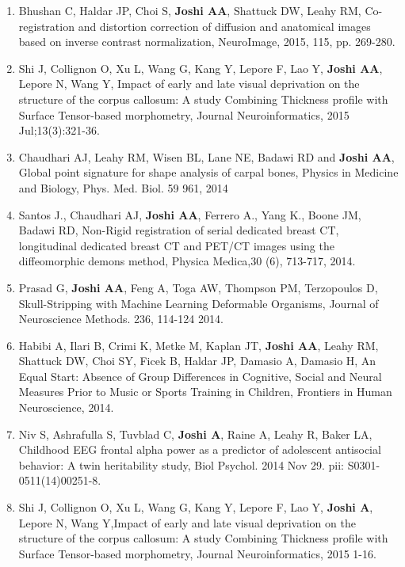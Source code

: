 \documentclass[overlapped,line,letterpaper]{res}
\begin{document}
\begin{resume}
\begin{enumerate}
    \item Bhushan C, Haldar JP, Choi S, \textbf{Joshi AA}, Shattuck DW, Leahy RM, {Co-registration and distortion correction of diffusion and anatomical images based on inverse contrast normalization}, NeuroImage, 2015, 115, pp. 269-280.

    \item Shi J, Collignon O, Xu L, Wang G, Kang Y, Lepore F, Lao Y, \textbf{Joshi AA}, Lepore N, Wang Y, {Impact of early and late visual deprivation on the structure of the corpus callosum: A study Combining Thickness profile with Surface Tensor-based morphometry}, Journal Neuroinformatics, 2015 Jul;13(3):321-36.

    \item Chaudhari AJ, Leahy RM, Wisen BL, Lane NE, Badawi RD and \textbf{Joshi AA}, {Global point signature for shape analysis of carpal bones}, Physics in Medicine and Biology,  Phys. Med. Biol. 59 961, 2014

    \item Santos J., Chaudhari AJ, \textbf{Joshi AA}, Ferrero A., Yang K., Boone JM, Badawi RD, {Non-Rigid registration of serial dedicated breast CT, longitudinal dedicated breast CT and PET/CT images using the diffeomorphic demons method}, Physica Medica,30 (6), 713-717, 2014.

    \item Prasad G, \textbf{Joshi AA}, Feng A, Toga AW, Thompson PM, Terzopoulos D, {Skull-Stripping with Machine Learning Deformable Organisms},  Journal of Neuroscience Methods.  236, 114-124 2014.

    \item Habibi A, Ilari B, Crimi K, Metke M, Kaplan JT, \textbf{Joshi AA}, Leahy RM, Shattuck DW, Choi SY, Ficek B, Haldar JP, Damasio A, Damasio H, {An Equal Start: Absence of Group Differences in Cognitive, Social and Neural Measures Prior to Music or Sports Training in Children},  Frontiers in Human Neuroscience, 2014.

    \item Niv S, Ashrafulla S, Tuvblad C, \textbf{Joshi A}, Raine A, Leahy R, Baker LA, {Childhood EEG frontal alpha power as a predictor of adolescent antisocial behavior: A twin heritability study}, Biol Psychol. 2014 Nov 29. pii: S0301-0511(14)00251-8.

    \item Shi J, Collignon O, Xu L, Wang G, Kang Y, Lepore F, Lao Y, \textbf{Joshi A}, Lepore N, Wang Y,{Impact of early and late visual deprivation on the structure of the corpus callosum: A study Combining Thickness profile with Surface Tensor-based morphometry}, Journal Neuroinformatics, 2015 1-16.


\end{enumerate}
\end{resume}
\end{document}
